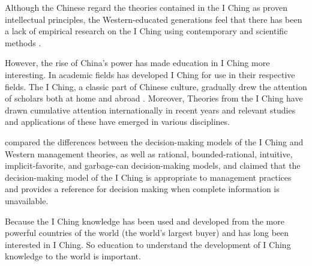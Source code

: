 \documentclass[conference]{IEEEtran}
\begin{document}
Although the Chinese regard the theories contained in the I Ching as proven intellectual principles, the Western-educated generations feel that there has been a lack of empirical research on the I Ching using contemporary and scientific methods \cite{5}.

However, the rise of China's power has made education in I Ching more interesting. In academic fields has developed I Ching for use in their respective fields.
The I Ching, a classic part of Chinese culture, gradually drew the attention of scholars both at home and abroad \cite{1}. 
Moreover, Theories from the I Ching have drawn cumulative attention internationally in recent years and relevant studies and applications of these have emerged in various disciplines. \cite{4}


\cite{1} compared the differences between the decision-making models of the I Ching and Western management theories, as well as rational, bounded-rational, intuitive, implicit-favorite, and garbage-can decision-making models, and claimed that the decision-making model of the I Ching is appropriate to management practices and provides a reference for decision making when complete information is unavailable.

Because the I Ching knowledge has been used and developed from the more powerful countries of the world (the world's largest buyer) and has long been interested in I Ching. So education to understand the development of I Ching knowledge to the world is important.
\end{document}
